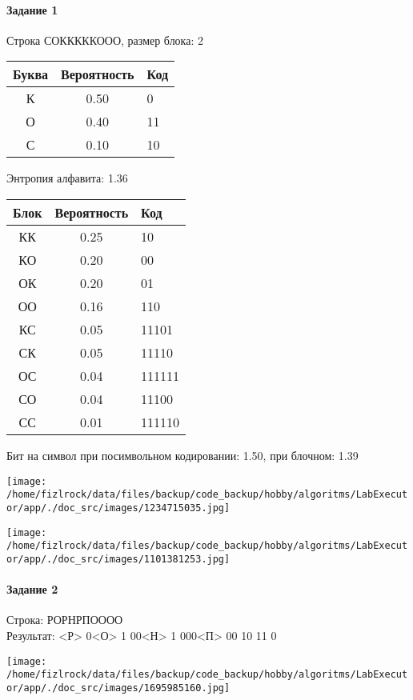 \documentclass[a4paper, 12pt]{article}
\begin{document}
\paragraph{Задание 1}

Строка СОКККККООО, размер блока: 2
\begin{center}
 \begin{tabular}{ |c|c|l| } 
  \hline
     Буква & Вероятность & Код\\ \hline
К & 0.50 & 0\\\hline
О & 0.40 & 11\\\hline
С & 0.10 & 10
\\ \hline \end{tabular}
\end{center}
Энтропия алфавита: 1.36
\begin{center}
 \begin{tabular}{ |c|c|l| } 
  \hline
     Блок & Вероятность & Код\\ \hline
КК & 0.25 & 10\\\hline
КО & 0.20 & 00\\\hline
ОК & 0.20 & 01\\\hline
ОО & 0.16 & 110\\\hline
КС & 0.05 & 11101\\\hline
СК & 0.05 & 11110\\\hline
ОС & 0.04 & 111111\\\hline
СО & 0.04 & 11100\\\hline
СС & 0.01 & 111110
\\ \hline \end{tabular}
\end{center}
Бит на символ при посимвольном кодировании: 1.50, при блочном: 1.39

\texttt{[image: /home/fizlrock/data/files/backup/code\_backup/hobby/algoritms/LabExecutor/app/./doc\_src/images/1234715035.jpg]}

\texttt{[image: /home/fizlrock/data/files/backup/code\_backup/hobby/algoritms/LabExecutor/app/./doc\_src/images/1101381253.jpg]}
\pagebreak
\paragraph{Задание 2}

Строка: 
РОРНРПОООО\\
Результат: <Р> 0<О> 1 00<Н> 1 000<П> 00 10 11 0

\texttt{[image: /home/fizlrock/data/files/backup/code\_backup/hobby/algoritms/LabExecutor/app/./doc\_src/images/1695985160.jpg]}
\end{document}
